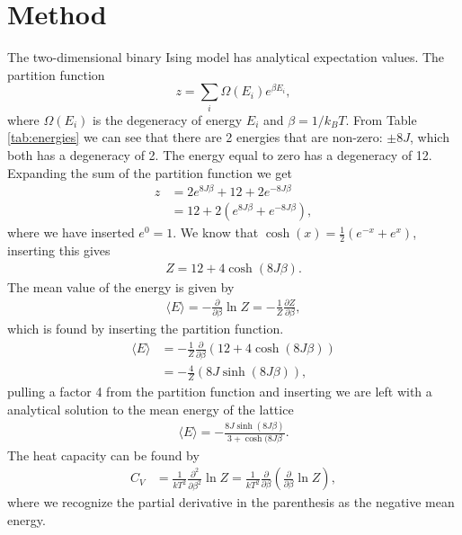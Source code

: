 \documentclass{emulateapj}
\begin{document}
\section{Method}
\label{sec:method}
The two-dimensional binary Ising model has analytical expectation values. The partition function
%
\begin{equation*}
    z = \sum_i \Omega(E_i) e^{\beta E_i},
\end{equation*}
%
where $\Omega(E_i)$ is the degeneracy of energy $E_i$ and $\beta = 1/k_BT$. From Table \ref{tab:energies} we can see that there are 2 energies that are non-zero: $\pm 8J$, which both has a degeneracy of 2. The energy equal to zero has a degeneracy of 12. Expanding the sum of the partition function we get 
%
\begin{align*}
    z &= 2e^{8J\beta} + 12 + 2e^{-8J\beta} \\
    &= 12 + 2\left(e^{8J\beta} + e^{-8J\beta}\right),
\end{align*}
%
where we have inserted $e^0 = 1$. We know that $\cosh(x) = \frac{1}{2}\left( e^{-x} + e^x\right)$, inserting this gives
%
\begin{gather}\label{eq:z}
    Z = 12 + 4\cosh(8J\beta).
\end{gather}
%
The mean value of the energy is given by
%
\begin{align*}
    \langle E \rangle = -\frac{\partial }{\partial \beta} \ln Z = -\frac{1}{Z}\frac{\partial Z}{\partial \beta},
\end{align*}
%
which is found by inserting the partition function.
%
\begin{align*}
    \langle E \rangle &= -\frac{1}{Z}\frac{\partial}{\partial \beta} \left(12 + 4 \cosh\left(8J\beta\right)\right)\\
    &= -\frac{4}{Z}\left(8J\sinh\left(8J\beta\right)\right),
\end{align*}
pulling a factor 4 from the partition function and inserting we are left with a analytical solution to the mean energy of the lattice
%
\begin{gather*}
    \langle E \rangle = -\frac{8J\sinh\left(8J\beta\right)}{3 + \cosh(8J\beta}.
\end{gather*}
%
The heat capacity can be found by
%
\begin{align*}
    C_V &= \frac{1}{kT^2}\frac{\partial^2}{\partial \beta^2} \ln Z = \frac{1}{kT^2}\frac{\partial}{\partial \beta}\left(\frac{\partial}{\partial \beta} \ln Z\right),
\end{align*}
%
where we recognize the partial derivative in the parenthesis as the negative mean energy. 
\end{document}

